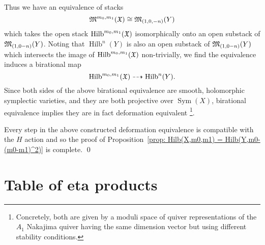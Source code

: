 \documentclass{article}
\theoremstyle{definition}
\newcommand{\X}{\frak{X}}
\newcommand{\M}{\frak{M}}
\newcommand{\Sym}{\operatorname{Sym}}
\newcommand{\Hilb}{\operatorname{Hilb}}
\begin{document}
Thus we have an equivalence of stacks
\[
\M^{m_{0},m_{1}}(\X ) \cong \M_{(1,0,-n)}(Y)
\]
which takes the open stack $\Hilb^{m_{0},m_{1}}(\X )$ isomorphically
onto an open substack of $\M_{(1,0-n)} (Y)$. Noting that
$\Hilb^{n}(Y)$ is also an open substack of $\M_{(1,0-n)} (Y)$ which
intersects the image of $\Hilb^{m_{0},m_{1}}(\X )$ non-trivially, we
find the equivalence induces a birational map
\[
\Hilb^{m_{0},m_{1}}(\X ) \dashrightarrow \Hilb^{n}(Y).
\]
Since both sides of the above birational equivalence are smooth,
holomorphic symplectic varieties, and they are both projective over
$\Sym (X)$, birational equivalence implies they are in fact
deformation equivalent \cite{}\footnote{Concretely, both are given by
a moduli space of quiver representations of the $A_{1}$ Nakajima
quiver having the same dimension vector but using different stability
conditions.}.

Every step in the above constructed deformation equivalence is
compatible with the $H$ action and so the proof of
Proposition~\ref{prop: Hilb(X,m0,m1) = Hilb(Y,m0-(m0-m1)^2)} is
complete. \qed 



\clearpage
\appendix
\section{Table of eta products}\label{app:tableeta}
\renewcommand{\arraystretch}{1.5}
\end{document}
